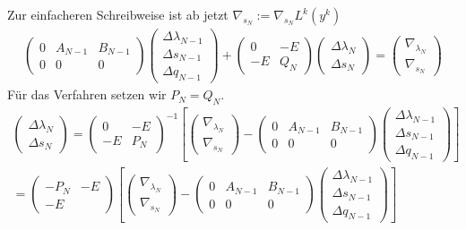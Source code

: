 \documentclass[12pt,a4paper]{article}
\begin{document}
  Zur einfacheren Schreibweise ist ab jetzt $ \nabla_{s_{N}} := \nabla_{s_{N}} L^{k}(y^{k}) $
  \begin{align*}
  \begin{pmatrix}
   0  & A_{N-1} & B_{N-1} \\
   0  & 0  &  0 
  \end{pmatrix}
  \begin{pmatrix}
  \Delta \lambda_{N-1} \\
  \Delta s_{N-1} \\
  \Delta q_{N-1} 
  \end{pmatrix} 
  +
  \begin{pmatrix}
   0 & -E \\
   -E  &  Q_N 
  \end{pmatrix}
  \begin{pmatrix}
  \Delta \lambda_{N} \\
  \Delta s_{N} 
  \end{pmatrix} 
  = 
  \begin{pmatrix}
  \nabla_{\lambda_{N}} \\ 
  \nabla_{s_{N}} 
  \end{pmatrix}
  \end{align*}
  Für das Verfahren setzen wir $ P_N = Q_N $.
  \begin{align*}
  \begin{pmatrix}
  \Delta \lambda_{N} \\
  \Delta s_{N} 
  \end{pmatrix}
  =
  \begin{pmatrix}
   0 & -E \\
   -E  &  P_N 
  \end{pmatrix}^{-1}
  \left[ 
  \begin{pmatrix}
  \nabla_{\lambda_{N}} \\ 
  \nabla_{s_{N}} 
  \end{pmatrix}
  -
  \begin{pmatrix}
   0  & A_{N-1} & B_{N-1} \\
   0  & 0  &  0 
  \end{pmatrix}
  \begin{pmatrix}
  \Delta \lambda_{N-1} \\
  \Delta s_{N-1} \\
  \Delta q_{N-1} 
  \end{pmatrix} \right] \\
  =
  \begin{pmatrix}
   -P_N & -E \\
   -E  &   
  \end{pmatrix}
  \left[ 
  \begin{pmatrix}
  \nabla_{\lambda_{N}} \\ 
  \nabla_{s_{N}} 
  \end{pmatrix}
  -
  \begin{pmatrix}
   0  & A_{N-1} & B_{N-1} \\
   0  & 0  &  0 
  \end{pmatrix}
  \begin{pmatrix}
  \Delta \lambda_{N-1} \\
  \Delta s_{N-1} \\
  \Delta q_{N-1} 
  \end{pmatrix} \right] 
  \end{align*}
\end{document}
